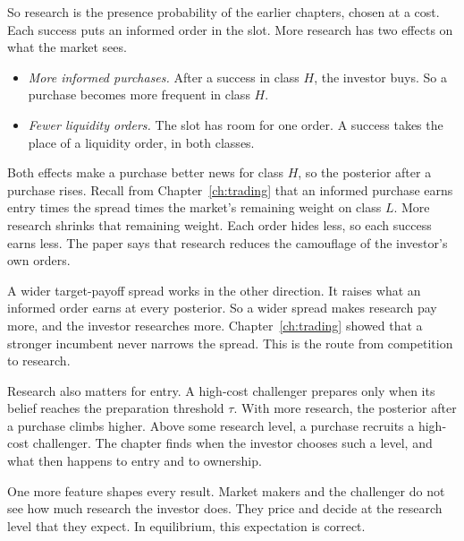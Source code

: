 So research is the presence probability of the earlier chapters, chosen at a cost. Each success puts an informed
order in the slot. More research has two effects on what the market sees.
\begin{itemize}
\item \emph{More informed purchases.} After a success in class \(H\), the investor buys. So a purchase becomes more
frequent in class \(H\).
\item \emph{Fewer liquidity orders.} The slot has room for one order. A success takes the place of a liquidity
order, in both classes.
\end{itemize}
Both effects make a purchase better news for class \(H\), so the posterior after a purchase rises. Recall from
Chapter~\ref{ch:trading} that an informed purchase earns entry times the spread times the market's remaining weight
on class \(L\). More research shrinks that remaining weight. Each order hides less, so each success earns less. The
paper says that research reduces the camouflage of the investor's own orders.

A wider target-payoff spread works in the other direction. It raises what an informed order earns at every
posterior. So a wider spread makes research pay more, and the investor researches more. Chapter~\ref{ch:trading}
showed that a stronger incumbent never narrows the spread. This is the route from competition to research.

Research also matters for entry. A high-cost challenger prepares only when its belief reaches the preparation
threshold \(\tau\). With more research, the posterior after a purchase climbs higher. Above some research level, a
purchase recruits a high-cost challenger. The chapter finds when the investor chooses such a level, and what then
happens to entry and to ownership.

One more feature shapes every result. Market makers and the challenger do not see how much research the investor
does. They price and decide at the research level that they expect. In equilibrium, this expectation is correct.

